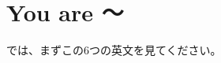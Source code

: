 \documentclass[book,jafontscale=0.9247]{jlreq}
\newenvironment{my_check}
  {\begin{itemize}
    \renewcommand\labelitemi{$\square\hspace{0.5em}$}} %
  {\end{itemize}}
\newcommand{\myStartLesson}{%
\vspace*{5pt}%
\noindent{}{\Large\gtfamily 授業スタート！}
\begin{my_check}
\item マイクON
\item カメラON\hspace{40pt}{\LARGE \ComputerMouse}
\end{my_check}
みなさん、こんにちは。
エデュオプちばの英語の授業にようこそ。\par
さて
音声は届いていますか？
なにかトラブルがあったら、チャットで教えてください。
どうぞよろしくお願いします。\par
きょうも暑いですね。
体調管理にはじゅうぶん気をつけてください。
みなさんも熱中症にならないように、
適切な水分補給をお願いします。
授業中でも差し支えありません。
遠慮なく水分を補給しながら、
リラックスして参加してください。\par
それでは授業にはいります。
\begin{my_check}
\item カメラOFF\hspace{40pt}{\LARGE \ComputerMouse}
\end{my_check}
}
\newcommand{\myMouse}{%
  {\large \ComputerMouse}
}
\begin{document}

%
%
%
%
%
%
%
%
%
%
%
%
%
%
%
%

%
%
%
%
%
%
%
%
%
%
%
%
%

\newpage
\section{You are 〜}
{\large \ComputerMouse}

では、まずこの6つの英文を見てください。
\end{document}
